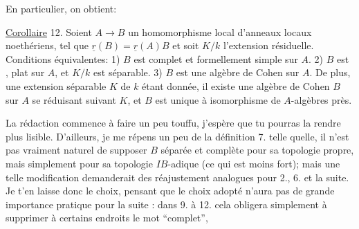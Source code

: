 
En particulier, on obtient:

\uline{Corollaire} 12. Soient $A\longrightarrow B$ un homomorphisme local d'anneaux locaux
noethériens, tel que $\underline{r}(B)=\underline{r}(A)B$ et  soit $K/k$ l'extension
résiduelle. Conditions équivalentes: 1) $B$ est complet et formellement
simple sur $A$. 2) $B$ est , plat sur $A$, et $K/k$ est séparable.
3) $B$ est une algèbre de Cohen sur $A$. De plus, une extension séparable
$K$ de $k$ étant donnée, il existe une algèbre de Cohen $B$ sur $A$ se réduisant
suivant $K$, et $B$ est unique à isomorphisme de $A$-algèbres près.

La rédaction commence à faire un peu touffu, j'espère que tu pourras
la rendre plus lisible. D'ailleurs, je me répens un peu de la définition
7. telle quelle, il n'est pas vraiment naturel de supposer $B$ séparée
et complète pour sa topologie propre, mais simplement pour sa topologie
$IB$-adique (ce qui est moins fort); mais une telle modification demanderait
des réajustement analogues pour 2., 6. et la suite. Je t'en laisse
donc le choix, pensant que le choix adopté n'aura pas de grande importance
pratique pour la suite : dans 9. à 12. cela obligera simplement à
supprimer à certains endroits le mot ``complet'',


